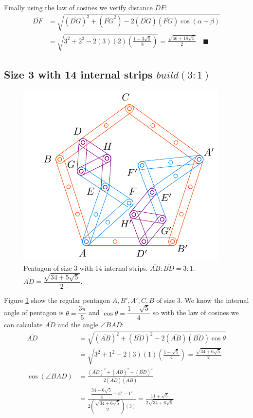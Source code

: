 \documentclass[11pt]{article}
\begin{document}
Finally using the law of cosines we verify distance $\overline{DF}$:
\begin{align}
\overline{DF} &= \sqrt{(\overline{DG})^2 + (\overline{FG}^2)
 - 2(\overline{DG})(\overline{FG})\cos(\alpha+\beta)} \nonumber\\
 &= \sqrt{3^2 + 2^2 - 2(3)(2)\left(\frac{1 - 3\sqrt5}8\right)}
 = \frac{\sqrt{46+18\sqrt5}}2 \quad\blacksquare
\end{align}

\subsection{Size 3 with 14 internal strips $build(3:1)$}

\begin{figure}[H]
\centering
\includegraphics[scale=1.2]{3/penta3-14a}
\caption{Pentagon of size 3 with 14 internal strips. $\overline{AB}:\overline{BD} = 3:1$. $\overline{AD} = \dfrac{\sqrt{34+5\sqrt5}}2$.}
\label{fig:penta3-14a}
\end{figure}

Figure \ref{fig:penta3-14a} show the regular pentagon $A,B',A',C,B$ of size $3$. We know the internal angle of pentagon is $\theta=\dfrac{3\pi}5$ and $\cos\theta=\dfrac{1-\sqrt5}4$ so with the law of cosines we can calculate $\overline{AD}$ and the angle $\angle{BAD}$:
\begin{align}
\overline{AD} &= \sqrt{(\overline{AB})^2 + (\overline{BD})^2
 - 2(\overline{AB})(\overline{BD})\cos\theta} \nonumber\\
 &= \sqrt{3^2 + 1^2 - 2(3)(1)\left(\frac{1-\sqrt5}4\right)} = \frac{\sqrt{34+6\sqrt5}}2\\
\cos(\angle{BAD}) &= \frac{(\overline{AD})^2 + (\overline{AB})^2 - (\overline{BD})^2}
 {2(\overline{AD})(\overline{AB})} \nonumber\\
 &= \frac{\dfrac{34+6\sqrt5}4 + 3^2 - 1^2}{2\left(\dfrac{\sqrt{34+6\sqrt5}}2\right)(3)}
  = \frac{11+\sqrt5}{2\sqrt{34+6\sqrt5}}
\end{align}
\end{document}
